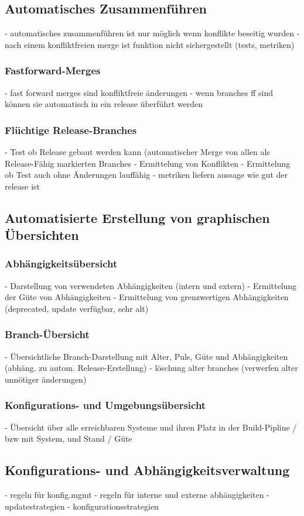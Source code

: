 \subsection{Automatisches Zusammenführen}
- automatisches zusammenführen ist nur möglich wenn konflikte beseitig wurden
- nach einem konfliktfreien merge ist funktion nicht sichergestellt (tests, metriken)
\subsubsection{Fastforward-Merges}
- fast forward merges sind konfliktfreie änderungen
- wenn branches ff sind können sie automatisch in ein release überführt werden
\subsubsection{Flüchtige Release-Branches}
- Test ob Release gebaut werden kann (automatischer Merge von allen als Release-Fähig markierten Branches
- Ermittelung von Konflikten
- Ermittelung ob Test auch ohne Änderungen lauffähig
- metriken liefern aussage wie gut der release ist
\subsection{Automatisierte Erstellung von graphischen Übersichten}
\subsubsection{Abhängigkeitsübersicht}
- Darstellung von verwendeten Abhängigkeiten (intern und extern)
- Ermittelung der Güte von Abhängigkeiten
- Ermittelung von grenzwertigen Abhängigkeiten (deprecated, update verfügbar, sehr alt)
\subsubsection{Branch-Übersicht}
- Übersichtliche Branch-Darstellung mit Alter, Puls, Güte und Abhängigkeiten (abhäng. zu autom. Release-Erstellung)
- löschung alter branches (verwerfen alter unnötiger änderungen)
\subsubsection{Konfigurations- und Umgebungsübersicht}
- Übersicht über alle erreichbaren Systeme und ihren Platz in der Build-Pipline / bzw mit System, und Stand / Güte

\subsection{Konfigurations- und Abhängigkeitsverwaltung}
- regeln für konfig.mgmt
- regeln für interne und externe abhängigkeiten
- updatestrategien
- konfigurationsstrategien
